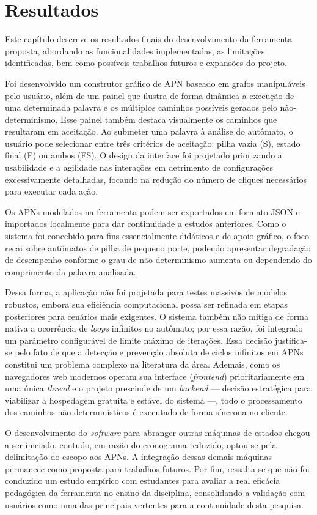 \chapter{Resultados}
\label{cap:resultados}
Este capítulo descreve os resultados finais do desenvolvimento da ferramenta proposta, abordando as funcionalidades implementadas, as limitações identificadas, bem como possíveis trabalhos futuros e expansões do projeto.

Foi desenvolvido um construtor gráfico de \ac{APN} baseado em grafos manipuláveis pelo usuário, além de um painel que ilustra de forma dinâmica a execução de uma determinada palavra e os múltiplos caminhos possíveis gerados pelo não-determinismo. Esse painel também destaca visualmente os caminhos que resultaram em aceitação. Ao submeter uma palavra à análise do autômato, o usuário pode selecionar entre três critérios de aceitação: pilha vazia (S), estado final (F) ou ambos (FS). O design da interface foi projetado priorizando a usabilidade e a agilidade nas interações em detrimento de configurações excessivamente detalhadas, focando na redução do número de cliques necessários para executar cada ação.

Os APNs modelados na ferramenta podem ser exportados em formato JSON e importados localmente para dar continuidade a estudos anteriores. Como o sistema foi concebido para fins essencialmente didáticos e de apoio gráfico, o foco recai sobre autômatos de pilha de pequeno porte, podendo apresentar degradação de desempenho conforme o grau de não-determinismo aumenta ou dependendo do comprimento da palavra analisada.

Dessa forma, a aplicação não foi projetada para testes massivos de modelos robustos, embora sua eficiência computacional possa ser refinada em etapas posteriores para cenários mais exigentes. O sistema também não mitiga de forma nativa a ocorrência de \textit{loops} infinitos no autômato; por essa razão, foi integrado um parâmetro configurável de limite máximo de iterações. Essa decisão justifica-se pelo fato de que a detecção e prevenção absoluta de ciclos infinitos em APNs constitui um problema complexo na literatura da área. Ademais, como os navegadores web modernos operam sua interface (\textit{frontend}) prioritariamente em uma única \textit{thread} e o projeto prescinde de um \textit{backend} — decisão estratégica para viabilizar a hospedagem gratuita e estável do sistema —, todo o processamento dos caminhos não-determinísticos é executado de forma síncrona no cliente.

O desenvolvimento do \textit{software} para abranger outras máquinas de estados chegou a ser iniciado, contudo, em razão do cronograma reduzido, optou-se pela delimitação do escopo aos APNs. A integração dessas demais máquinas permanece como proposta para trabalhos futuros. Por fim, ressalta-se que não foi conduzido um estudo empírico com estudantes para avaliar a real eficácia pedagógica da ferramenta no ensino da disciplina, consolidando a validação com usuários como uma das principais vertentes para a continuidade desta pesquisa.

